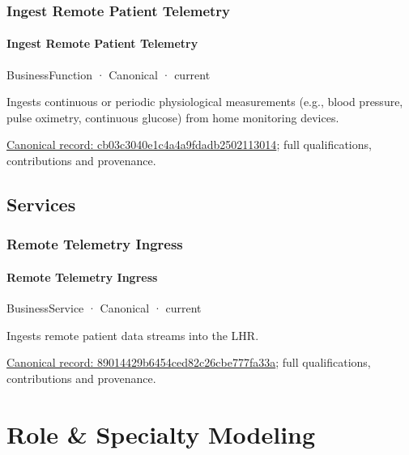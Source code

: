 \subsubsection{Ingest Remote Patient Telemetry}

\paragraph{Ingest Remote Patient Telemetry}

\label{element:cb03c3040e1c4a4a9fdadb2502113014}
{\small BusinessFunction · Canonical · current}\par

Ingests continuous or periodic physiological measurements (e.g., blood pressure, pulse oximetry, continuous glucose) from home monitoring devices.


{\footnotesize \href{../../../../continuum/business/business-function/cb03c3040e1c4a4a9fdadb2502113014.md}{Canonical record: cb03c3040e1c4a4a9fdadb2502113014}; full qualifications, contributions and provenance.}\par
\subsection{Services}

\subsubsection{Remote Telemetry Ingress}

\paragraph{Remote Telemetry Ingress}

\label{element:89014429b6454ced82c26cbe777fa33a}
{\small BusinessService · Canonical · current}\par

Ingests remote patient data streams into the LHR.


{\footnotesize \href{../../../../continuum/business/business-service/89014429b6454ced82c26cbe777fa33a.md}{Canonical record: 89014429b6454ced82c26cbe777fa33a}; full qualifications, contributions and provenance.}\par
\section{Role \& Specialty Modeling}

